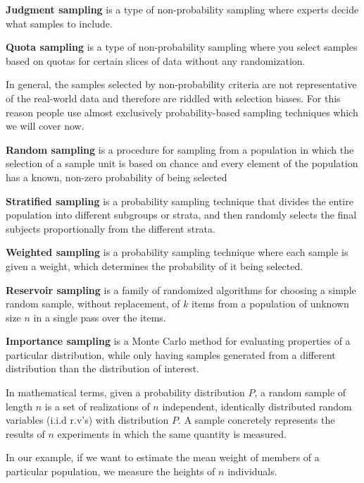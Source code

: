 \textbf{Judgment sampling} is a type of non-probability sampling where experts decide what samples to include.
\ed

\textbf{Quota sampling} is a type of non-probability sampling where you select samples based on quotas for certain
slices of data without any randomization.
\ed

In general, the samples selected by non-probability criteria are not representative of the real-world data and therefore
are riddled with selection biases. For this reason people use almost exclusively probability-based sampling techniques
which we will cover now.

\textbf{Random sampling} is a procedure for sampling from a population in which the selection of a sample unit is
based on chance and every element of the population has a known, non-zero probability of being selected
\ed

\textbf{Stratified sampling} is a probability sampling technique that divides the entire population into different
subgroups or strata, and then randomly selects the final subjects proportionally from the different strata.
\ed

\textbf{Weighted sampling} is a probability sampling technique where each sample is given a weight, which determines the
probability of it being selected.
\ed

\textbf{Reservoir sampling} is a family of randomized algorithms for choosing a simple random sample, without
replacement, of $k$ items from a population of unknown size $n$ in a single pass over the items.
\ed

\textbf{Importance sampling} is a Monte Carlo method for evaluating properties of a particular distribution, while only
having samples generated from a different distribution than the distribution of interest.
\ed

In mathematical terms, given a probability distribution $P$, a random sample of length $n$ is a set of realizations
of $n$ independent, identically distributed random variables (i.i.d r.v's) with distribution $P$. A sample concretely
represents the results of $n$ experiments in which the same quantity is measured.

\be
In our example, if we want to estimate the mean weight of members of a particular population, we measure the heights of
$n$ individuals.
\ee

